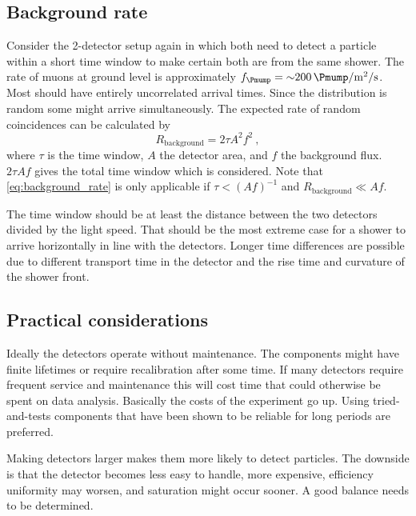 \subsection{Background rate}

Consider the 2-detector setup again in which both need to detect a particle within a short time window to make certain both are from the same shower. The rate of muons at ground level is approximately $f_{\Pmump} = \SI{~200}{\Pmump\per\meter\squared\per\second}$. Most should have entirely uncorrelated arrival times. Since the distribution is random some might arrive simultaneously. The expected rate of random coincidences can be calculated by
%
\begin{equation}
    \label{eq:background_rate}
    R_{\mathrm{background}} = 2 \tau A^2 f^2 \ ,
\end{equation}
%
where $\tau$ is the time window, $A$ the detector area, and $f$ the background flux. $2 \tau A f$ gives the total time window which is considered. Note that \cref{eq:background_rate} is only applicable if $\tau < (A f)^{-1}$ and $R_{\mathrm{background}} \ll Af$.

The time window should be at least the distance between the two detectors divided by the light speed. That should be the most extreme case for a shower to arrive horizontally in line with the detectors. Longer time differences are possible due to different transport time in the detector and the rise time and curvature of the shower front.

\subsection{Practical considerations}

Ideally the detectors operate without maintenance. The components might have finite lifetimes or require recalibration after some time. If many detectors require frequent service and maintenance this will cost time that could otherwise be spent on data analysis. Basically the costs of the experiment go up. Using tried-and-tests components that have been shown to be reliable for long periods are preferred.

Making detectors larger makes them more likely to detect particles. The downside is that the detector becomes less easy to handle, more expensive, efficiency uniformity may worsen, and saturation might occur sooner. A good balance needs to be determined.

